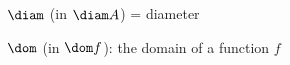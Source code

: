 \indexmedskip
{}

























$\diam$ (in $\diam A$) = diameter



$\dom$ (in $\dom f$):  the domain of a function $f$
























































































